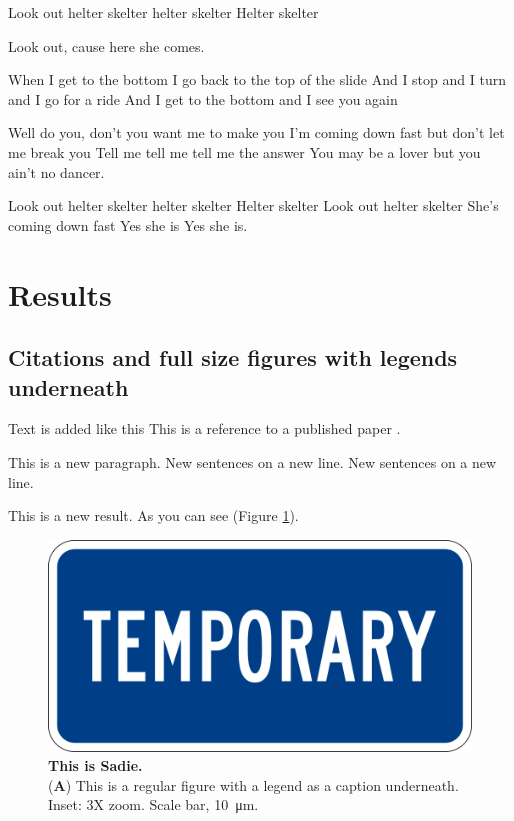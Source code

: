 Look out helter skelter helter skelter
Helter skelter 

Look out, cause here she comes.

When I get to the bottom I go back to the top of the slide
And I stop and I turn and I go for a ride
And I get to the bottom and I see you again

Well do you, don't you want me to make you
I'm coming down fast but don't let me break you
Tell me tell me tell me the answer
You may be a lover but you ain't no dancer.

Look out helter skelter helter skelter
Helter skelter
Look out helter skelter
She's coming down fast 
Yes she is 
Yes she is.

\section*{Results}\label{s:results}

\subsection*{Citations and full size figures with legends underneath}

Text is added like this
This is a reference to a published paper \citep{robinson_rapid_2010}.

This is a new paragraph.
New sentences on a new line.
New sentences on a new line.

This is a new result.
As you can see (Figure \ref{fig:sadie}).

\begin{figure}[ht]
\centering
\includegraphics[width=0.75\linewidth]{Figures/temp.png}
\caption{\textbf{This is Sadie.}\\
(\textbf{A}) This is a regular figure with a legend as a caption underneath. Inset: 3X zoom. Scale bar, \SI{10}{\micro\meter}.}
\label{fig:sadie}
\end{figure}

